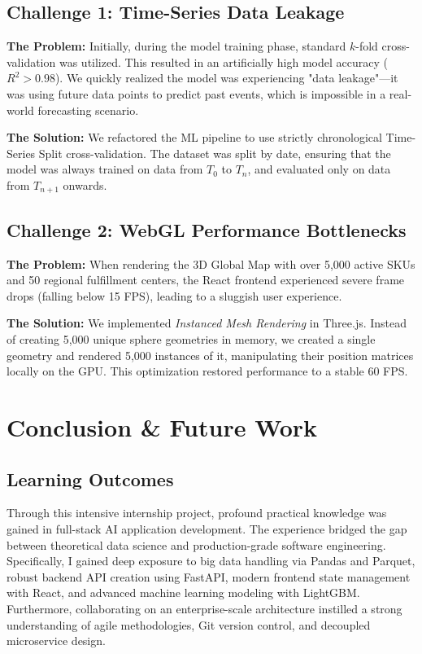 \documentclass[12pt,a4paper]{report}
\begin{document}
\section{Challenge 1: Time-Series Data Leakage}
\textbf{The Problem:} Initially, during the model training phase, standard $k$-fold cross-validation was utilized. This resulted in an artificially high model accuracy ($R^2 > 0.98$). We quickly realized the model was experiencing "data leakage"—it was using future data points to predict past events, which is impossible in a real-world forecasting scenario.

\textbf{The Solution:} We refactored the ML pipeline to use strictly chronological Time-Series Split cross-validation. The dataset was split by date, ensuring that the model was always trained on data from $T_0$ to $T_n$, and evaluated only on data from $T_{n+1}$ onwards.

\section{Challenge 2: WebGL Performance Bottlenecks}
\textbf{The Problem:} When rendering the 3D Global Map with over 5,000 active SKUs and 50 regional fulfillment centers, the React frontend experienced severe frame drops (falling below 15 FPS), leading to a sluggish user experience.

\textbf{The Solution:} We implemented \textit{Instanced Mesh Rendering} in Three.js. Instead of creating 5,000 unique sphere geometries in memory, we created a single geometry and rendered 5,000 instances of it, manipulating their position matrices locally on the GPU. This optimization restored performance to a stable 60 FPS.

\chapter{Conclusion \& Future Work}

\section{Learning Outcomes}
Through this intensive internship project, profound practical knowledge was gained in full-stack AI application development. The experience bridged the gap between theoretical data science and production-grade software engineering. Specifically, I gained deep exposure to big data handling via Pandas and Parquet, robust backend API creation using FastAPI, modern frontend state management with React, and advanced machine learning modeling with LightGBM. Furthermore, collaborating on an enterprise-scale architecture instilled a strong understanding of agile methodologies, Git version control, and decoupled microservice design.
\end{document}
